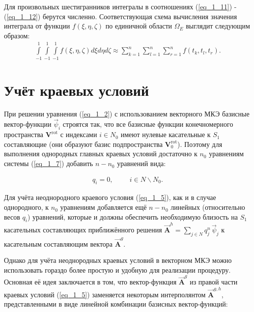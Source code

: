 Для произвольных шестигранников интегралы в соотношениях (\ref{eq_1_11}) - (\ref{eq_1_12}) берутся численно. Соответствующая схема вычисления значения интеграла от функции $f(\xi, \eta, \zeta)$ по единичной области $\Omega_E$ выглядит следующим образом:
\begin{equation} \label{eq_1_14}
	\begin{gathered}
		\int \limits_{-1}^1 \int \limits_{-1}^1 \int \limits_{-1}^1 f \left(\xi, \eta, \zeta\right) d\xi d\eta d\zeta \approx \sum_{k=1}^{n} \sum_{l=1}^{n} \sum_{r=1}^{n} f\left(t_k, t_l, t_r\right).
	\end{gathered}
\end{equation}

\section{Учёт краевых условий}

При решении уравнения (\ref{eq_1_2}) с использованием векторного МКЭ базисные вектор-функции $\overrightarrow{\psi}_i$ строятся так, что все базисные функции конечномерного пространства $\textbf{V}^\text{rot}$ с индексами $i \in N_0$ имеют нулевые касательные к $S_1$ составляющие (они образуют базис подпространства $\textbf{V}^\text{rot}_0$). Поэтому для выполнения однородных главных краевых условий достаточно к $n_0$ уравнениям системы (\ref{eq_1_7}) добавить $n - n_0$ уравнений вида:

\begin{equation} \label{eq_1_15}
	\begin{gathered}
		q_i = 0, \hspace{1cm} i \in N \backslash N_0.
	\end{gathered}
\end{equation}

Для учёта неоднородного краевого условия (\ref{eq_1_5}), как и в случае однородного, к $n_0$ уравнениям добавляется ещё $n - n_0$ линейных (относительно весов $q_i$) уравнений, которые и должны обеспечить необходимую близость на $S_1$ касательных составляющих приближённого решения $\overrightarrow{\textbf{A}}^h = \sum \limits_{j \in N} q_j^n \, \overrightarrow{\psi}_j$ к касательным составляющим вектора $\overrightarrow{\textbf{A}}^g$.

Однако для учёта неоднородных краевых условий в векторном МКЭ можно использовать гораздо более простую и удобную для реализации процедуру. Основная её идея заключается в том, что вектор-функция $\overrightarrow{\textbf{A}}^g$ из правой части краевых условий (\ref{eq_1_5}) заменяется некоторым интерполянтом $\overrightarrow{\textbf{A}}^{g,h}$, представленными в виде линейной комбинации базисных вектор-функций: 

